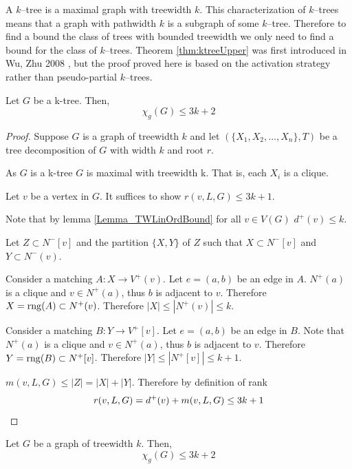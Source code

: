 
A $k$--tree is a maximal graph with treewidth $k$. This characterization of $k$--trees means that a graph with pathwidth $k$ is a subgraph of some $k$--tree. Therefore to find a bound the class of trees with bounded treewidth we only need to find a bound for the class of $k$--trees. Theorem \ref{thm:ktreeUpper} was first introduced in Wu, Zhu 2008 \cite{WuZhu2008}, but the proof proved here is based on the activation strategy rather than pseudo-partial $k$--trees.
\begin{theorem} \label{thm:ktreeUpper}
        Let $G$ be a k-tree. Then, 
        \[\chi_g(G) \leq 3k + 2\]
\end{theorem}

\begin{proof}
    Suppose $G$ is a graph of treewidth $k$ and let $(\{X_1,X_2,\dots,X_n\},T)$ be a tree decomposition of $G$ with width $k$ and root $r$.
    
    As $G$ is a k-tree $G$ is maximal with treewidth k. That is, each $X_i$ is a clique.
    
    Let $v$ be a vertex in $G$. It suffices to show $r(v,L,G) \leq 3k + 1$.
    
    
    Note that by lemma \ref{Lemma_TWLinOrdBound} for all $v \in V(G)$ $d^+(v) \leq k$.
    
    Let $Z \subset N^-[v]$ and the partition $\{X,Y\}$ of $Z$ such that $X\subset N^-[v]$ and  $Y\subset N^-(v)$.
           
    Consider a matching $A\colon X \to V^+(v)$. Let $e=(a,b)$ be an edge in $A$.
    $N^+(a)$ is a clique and $v\in N^+(a)$, thus $b$ is adjacent to $v$. Therefore $X =\operatorname{rng}(A)\subset N^+(v)$. Therefore $|X| \leq |N^+(v)| \leq k$. 
    
    Consider a matching $B\colon Y \to V^+[v]$. Let $e=(a,b)$ be an edge in $B$.
    Note that $N^+(a)$ is a clique and $v\in N^+(a)$, thus $b$ is adjacent to $v$. Therefore $Y =\operatorname{rng}(B)\subset N^+[v]$. Therefore $|Y| \leq |N^+[v]| \leq k+1$. 
        
    $m(v,L,G) \leq |Z| = |X|+|Y|$. Therefore by definition of rank \[r(v,L,G) = d^+(v) + m(v,L,G) \leq 3k +1 \qedhere\]        
\end{proof}

\begin{corollary}
    Let $G$ be a graph of treewidth $k$. Then, 
    \[\chi_g(G) \leq 3k + 2\]
\end{corollary}

